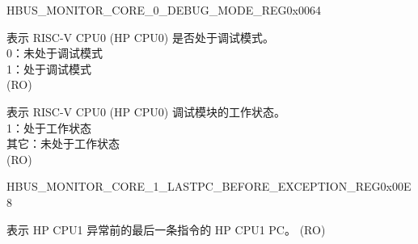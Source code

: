 \begin{register}{H}{BUS\_MONITOR\_CORE\_0\_DEBUG\_MODE\_REG}{0x0064}\label{regdesc:BUSMONITORCORE0DEBUGMODEREG}
%
%
%
\regnewline%
\begin{regdesc}\begin{reglist}
\label{fielddesc:BUSMONITORCORE0DEBUGMODE}\item [BUS\_MONITOR\_CORE\_0\_DEBUG\_MODE] 表示 RISC-V CPU0 (HP CPU0) 是否处于调试模式。\\
0：未处于调试模式\\
1：处于调试模式\\ (RO)
\label{fielddesc:BUSMONITORCORE0DEBUGMODULEACTIVE}\item [BUS\_MONITOR\_CORE\_0\_DEBUG\_MODULE\_ACTIVE] 表示 RISC-V CPU0 (HP CPU0) 调试模块的工作状态。\\
1：处于工作状态\\
其它：未处于工作状态\\ (RO)
\end{reglist}\end{regdesc}
\end{register}


\begin{register}{H}{BUS\_MONITOR\_CORE\_1\_LASTPC\_BEFORE\_EXCEPTION\_REG}{0x00E8}\label{regdesc:BUSMONITORCORE1LASTPCBEFOREEXCEPTIONREG}
%
\regnewline%
\begin{regdesc}\begin{reglist}
\label{fielddesc:BUSMONITORCORE1LASTPCBEFOREEXC}\item [BUS\_MONITOR\_CORE\_1\_LASTPC\_BEFORE\_EXC] 表示 HP CPU1 异常前的最后一条指令的 HP CPU1 PC。 (RO)
\end{reglist}\end{regdesc}
\end{register}



